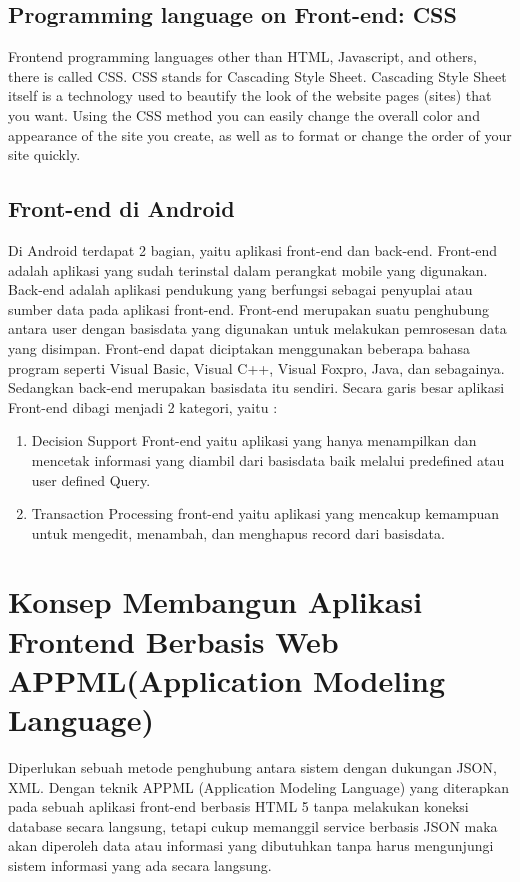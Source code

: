 \subsection{Programming language on Front-end: CSS }
Frontend programming languages other than HTML, Javascript, and others, there is called CSS. CSS stands for Cascading Style Sheet. Cascading Style Sheet itself is a technology used to beautify 
the look of the website pages (sites) that you want. Using the CSS method you can easily change the overall color and appearance of the site you create, as well as to format or change the order of your site quickly\cite{poetra2003tutorial}.

\subsection{Front-end di Android}
Di Android terdapat 2 bagian, yaitu aplikasi front-end dan back-end. Front-end adalah aplikasi yang sudah terinstal dalam perangkat mobile yang digunakan.
Back-end adalah aplikasi pendukung yang berfungsi sebagai penyuplai atau sumber data pada aplikasi front-end. Front-end merupakan suatu penghubung
antara user dengan basisdata yang digunakan untuk melakukan pemrosesan data yang disimpan. Front-end dapat diciptakan menggunakan 
beberapa bahasa program seperti Visual Basic, Visual C++, Visual Foxpro, Java, dan sebagainya. Sedangkan back-end merupakan basisdata itu sendiri.
 Secara garis besar aplikasi Front-end dibagi menjadi 2 kategori, yaitu :
\begin{enumerate}
\item Decision Support Front-end yaitu aplikasi yang hanya menampilkan  dan mencetak informasi yang diambil dari basisdata baik melalui predefined atau user defined Query.
\item  Transaction Processing front-end yaitu aplikasi yang mencakup kemampuan untuk mengedit, menambah, dan menghapus record dari basisdata\cite{nuari2014perancangan}.
\end{enumerate}
\section{Konsep Membangun Aplikasi Frontend Berbasis Web APPML(Application Modeling Language) }
Diperlukan sebuah metode penghubung antara sistem dengan dukungan JSON, XML. Dengan teknik APPML (Application Modeling Language) yang diterapkan pada sebuah aplikasi front-end berbasis HTML 5 tanpa melakukan koneksi database secara langsung, tetapi cukup memanggil service berbasis JSON maka akan diperoleh data atau informasi yang dibutuhkan tanpa harus mengunjungi sistem informasi yang ada secara langsung\cite{triyono2017konsep}.

